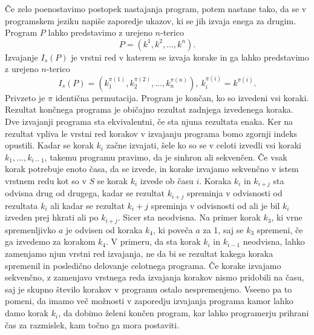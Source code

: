 \documentclass[12pt,a4paper,twoside]{article}
\theoremstyle{definition} %
\theoremstyle{plain} %
\numberwithin{equation}{section}  %
\begin{document}
Če zelo poenostavimo postopek nastajanja program, potem nastane tako, da se v programskem jeziku napiše zaporedje ukazov, ki se jih izvaja enega za drugim. Program $P$ lahko predstavimo z urejeno $n$-terico 
$$P = (k^1, k^2,..., k^n).$$ 
Izvajanje $I_s(P)$ je vrstni red v katerem se izvaja korake in ga lahko predstavimo z urejeno $n$-terico
$$I_s(P) = (k_1^{\pi(1)}, k_2^{\pi(2)},..., k_n^{\pi(n)}),\ k_i^{\pi(i)} = k^{\pi(i)}.$$
Privzeto je $\pi$ identična permutacija. Program je končan, ko so izvedeni vsi koraki. Rezultat končnega programa je običajno rezultat zadnjega izvedenega koraka. Dve izvajanji programa sta ekvivalentni, če sta njuna rezultata enaka. Ker na rezultat vpliva le vrstni red korakov v izvajanju programa bomo zgornji indeks opustili. Kadar se korak $k_i$ začne izvajati, šele ko so se v celoti izvedli vsi koraki $k_1,...,k_{i-1}$, takemu programu pravimo, da je sinhron ali sekvenčen. Če vsak korak potrebuje enoto časa, da se izvede, in korake izvajamo sekvenčno v istem vrstnem redu kot so v $S$ se korak $k_i$ izvede ob času $i$. Koraka $k_i$ in $k_{i+j}$ sta odvisna drug od drugega, kadar se rezultat $k_{i+j}$ spreminja v odvisnosti od rezultata $k_i$ ali kadar se rezultat $k_i+j$ spreminja v odvisnosti od ali je bil $k_i$ izveden prej hkrati ali po $k_{i+j}$. Sicer sta neodvisna. Na primer korak $k_3$, ki vrne spremenljivko $a$ je odvisen od koraka $k_4$, ki poveča $a$ za 1, saj se $k_3$ spremeni, če ga izvedemo za korakom $k_4$. V primeru, da sta korak $k_i$ in $k_{i-1}$ neodvisna, lahko zamenjamo njun vrstni red izvajanja, ne da bi se rezultat kakega koraka spremenil in posledično delovanje celotnega programa.
Če korake izvajamo sekvenčno, z zamenjavo vrstnega reda izvajanja korakov nismo pridobili na času, saj je skupno število korakov v programu ostalo nespremenjeno. Vseeno pa to pomeni, da imamo več možnosti v zaporedju izvajanja programa kamor lahko damo korak $k_i$, da dobimo želeni končen program, kar lahko programerju prihrani čas za razmislek, kam točno ga mora postaviti.
\end{document}
